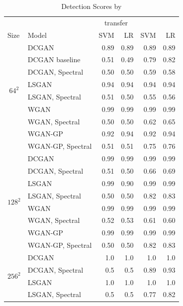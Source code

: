 \documentclass[letterpaper]{article} %
\begin{document}
\iffalse
\begin{table}
    \caption{Detection Scores by \cite{margret2020upconvolution}}
    \centering
    \begin{tabular}{l|l|rr|rr}
        \toprule
        &&\multicolumn{2}{c|}{transfer}&\multicolumn{2}{c}{}\\
        Size & Model &SVM&LR&SVM&LR \\
        \midrule
\multicolumn{1}{c|}{\multirow{8}{*}{$64^2$}}
& DCGAN & 0.89&0.89& 0.89&0.89\\
& DCGAN baseline & 0.51&0.49& 0.79&0.82\\
 & DCGAN, Spectral &0.50 &0.50 &0.59&0.58\\
 \cline{2-6}
 & LSGAN & 0.94 & 0.94& 0.94 & 0.94\\
 & LSGAN, Spectral & 0.51 & 0.50 & 0.55&0.56 \\ \cline{2-6}
 & WGAN & 0.99&0.99&0.99&0.99\\
 & WGAN, Spectral & 0.50&0.50 & 0.62&0.65 \\ \cline{2-6}
 & WGAN-GP & 0.92&0.94&0.92&0.94 \\
 & WGAN-GP, Spectral&0.51&0.51&0.75&0.76\\ \midrule
\multicolumn{1}{c|}{\multirow{8}{*}{$128^2$}} & DCGAN & 0.99 & 0.99 &0.99&0.99 \\
 & DCGAN, Spectral & 0.51&0.50&0.66&0.69 \\ \cline{2-6}
 & LSGAN & 0.99 &0.90&0.99&0.99  \\
 & LSGAN, Spectral &  0.50& 0.50 & 0.82&0.83  \\ \cline{2-6}
 & WGAN & 0.99 & 0.99 & 0.99&0.99 \\
 & WGAN, Spectral & 0.52& 0.53 &0.61 &0.60 \\ \cline{2-6}
 & WGAN-GP &  0.99& 0.99 &   0.99& 0.99 \\
 & WGAN-GP, Spectral &  0.50&0.50& 0.82 & 0.83 \\\midrule
\multicolumn{1}{c|}{\multirow{4}{*}{$256^2$}} & DCGAN & 1.0&1.0&1.0&1.0  \\
 & DCGAN, Spectral &  0.5& 0.5 &  0.89&0.93\\ \cline{2-6}
 & LSGAN & 1.0 & 1.0 & 1.0&1.0 \\
 & LSGAN, Spectral &0.5 &0.5  & 0.77&0.82\\ \bottomrule
    \end{tabular}

\end{table}
\end{document}
